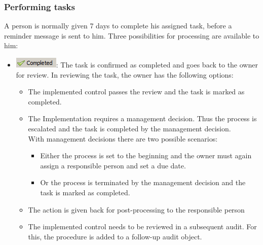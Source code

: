 \documentclass[a4paper,10pt]{book}
\begin{document}
\subsubsection{Performing tasks}
A person is normally given 7 days to complete his assigned task, before a reminder message is sent to him. Three possibilities for processing are available to him:
\begin{itemize}
\item \includegraphics[height=3ex]{Icon/Erledigt-en.png}: The task is confirmed as completed and goes back to the owner for review. In reviewing the task, the owner has the following options:
  \begin{itemize}
   \item The implemented control passes the review and the task is marked as completed.
   \item The Implementation requires a management decision. Thus the process is escalated and the task is completed by the management decision.
\newline\\
With management decisions there are two possible scenarios:
\begin{itemize}
 \item Either the process is set to the beginning and the owner must again assign a responsible person and set a due date.
 \item Or the process is terminated by the management decision and the task is marked as completed.
\end{itemize}
   \item The action is given back for post-processing to the responsible person
   \item The implemented control needs to be reviewed in a subsequent audit. For this, the procedure is added to a follow-up audit object.
  \end{itemize}
  \begin{figure}[htb!]
  \centering

\end{figure}
\end{itemize}
\end{document}
